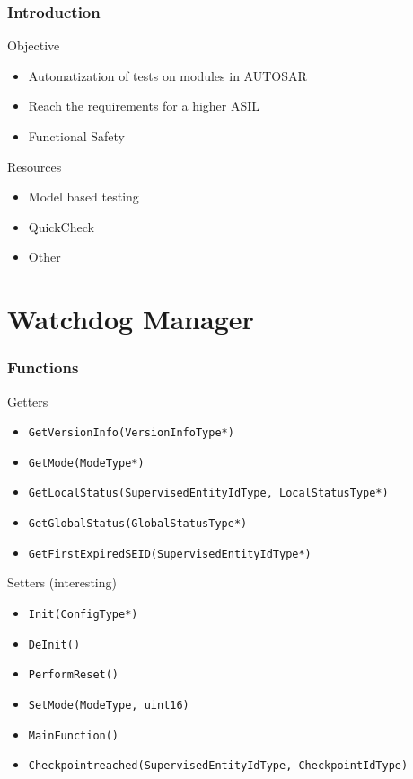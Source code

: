 \documentclass{beamer}
\begin{document}
\begin{frame}[fragile]
  \frametitle{Introduction}
  \begin{block}{Objective}
    \begin{itemize}
        \item Automatization of tests on modules in AUTOSAR
        \item Reach the requirements for a higher ASIL
        \item Functional Safety
    \end{itemize}
   \end{block}
  \begin{block}{Resources}
    \begin{itemize}
        \item Model based testing
        \item QuickCheck
        \item Other
    \end{itemize}
  \end{block}
\end{frame}

\section{Watchdog Manager}
\begin{frame}[fragile]
  \frametitle{Functions}
  \begin{block}{Getters}
    \begin{itemize}
      \item \lstinline!GetVersionInfo(VersionInfoType*)!
      \item \lstinline!GetMode(ModeType*)!
      \item \lstinline!GetLocalStatus(SupervisedEntityIdType, LocalStatusType*)!
      \item \lstinline!GetGlobalStatus(GlobalStatusType*)!
      \item \lstinline!GetFirstExpiredSEID(SupervisedEntityIdType*)!
    \end{itemize}
  \end{block}

  \begin{block}{Setters (interesting)}
    \begin{itemize}
      \item \lstinline!Init(ConfigType*)!
      \item \lstinline!DeInit()!
      \item \lstinline!PerformReset()!
      \item \lstinline!SetMode(ModeType, uint16)!
      \item \lstinline!MainFunction()!
      \item \lstinline!Checkpointreached(SupervisedEntityIdType, CheckpointIdType)!
    \end{itemize}
  \end{block}
\end{frame}
\end{document}

